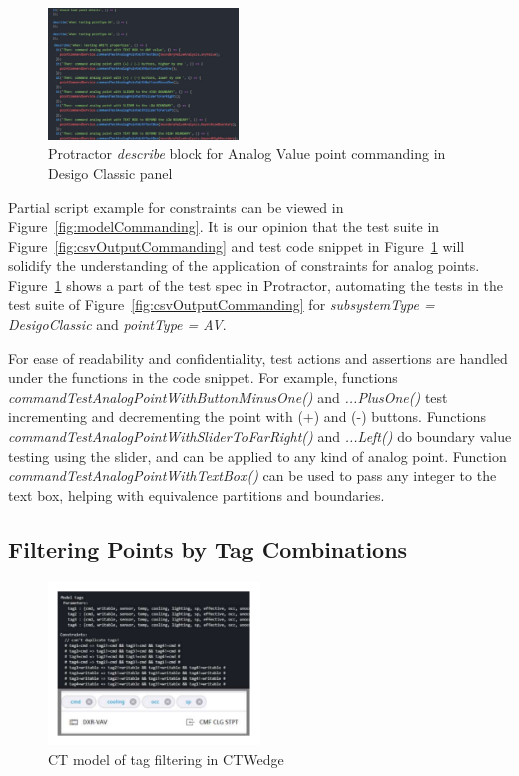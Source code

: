 \documentclass[conference]{IEEEtran}
\begin{document}
	\begin{figure}[!b]
		\includegraphics[width=0.45\textwidth,]{pointCommandingTestCode.pdf}
		\caption{Protractor \textit{describe} block for Analog Value point commanding in Desigo Classic panel}
		\label{fig:pointCommandingTestCode}
	\end{figure}

	Partial script example for constraints can be viewed in Figure~\ref{fig:modelCommanding}. 
	It is our opinion that the test suite in Figure~\ref{fig:csvOutputCommanding} and test code snippet in Figure~\ref{fig:pointCommandingTestCode} will solidify the understanding of the application of constraints for analog points.
	Figure~\ref{fig:pointCommandingTestCode} shows a part of the test spec in Protractor, automating the tests in the test suite of Figure~\ref{fig:csvOutputCommanding} for \textit{subsystemType = DesigoClassic} and \textit{pointType = AV}.
	
	For ease of readability and confidentiality, test actions and assertions are handled under the functions in the code snippet. 
	For example, functions \textit{commandTestAnalogPointWithButtonMinusOne()} and \textit{...PlusOne()} test incrementing and decrementing the point with (+) and (-) buttons.
	Functions \textit{commandTestAnalogPointWithSliderToFarRight()} and \textit{...Left()} do boundary value testing using the slider, and can be applied to any kind of analog point.
	Function \textit{commandTestAnalogPointWithTextBox()} can be used to pass any integer to the text box, helping with equivalence partitions and boundaries.

	\subsection{Filtering Points by Tag Combinations }

	\begin{figure}[!b]
		\includegraphics[width=0.50\textwidth,]{tagFilterModel.pdf}
		\caption{CT model of tag filtering in CTWedge}
		\label{fig:tagFilterModel}
	\end{figure}
\end{document}
